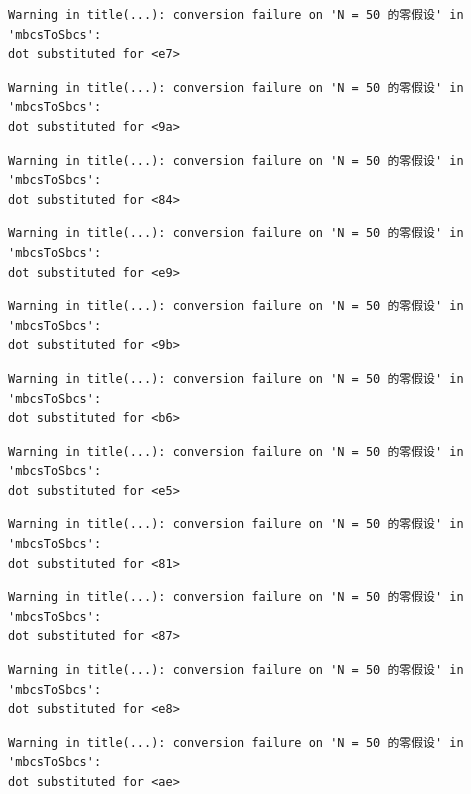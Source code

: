 \documentclass[
  letterpaper,
  DIV=11,
  numbers=noendperiod]{scrreprt}
\begin{document}
\begin{verbatim}
Warning in title(...): conversion failure on 'N = 50 的零假设' in 'mbcsToSbcs':
dot substituted for <e7>
\end{verbatim}

\begin{verbatim}
Warning in title(...): conversion failure on 'N = 50 的零假设' in 'mbcsToSbcs':
dot substituted for <9a>
\end{verbatim}

\begin{verbatim}
Warning in title(...): conversion failure on 'N = 50 的零假设' in 'mbcsToSbcs':
dot substituted for <84>
\end{verbatim}

\begin{verbatim}
Warning in title(...): conversion failure on 'N = 50 的零假设' in 'mbcsToSbcs':
dot substituted for <e9>
\end{verbatim}

\begin{verbatim}
Warning in title(...): conversion failure on 'N = 50 的零假设' in 'mbcsToSbcs':
dot substituted for <9b>
\end{verbatim}

\begin{verbatim}
Warning in title(...): conversion failure on 'N = 50 的零假设' in 'mbcsToSbcs':
dot substituted for <b6>
\end{verbatim}

\begin{verbatim}
Warning in title(...): conversion failure on 'N = 50 的零假设' in 'mbcsToSbcs':
dot substituted for <e5>
\end{verbatim}

\begin{verbatim}
Warning in title(...): conversion failure on 'N = 50 的零假设' in 'mbcsToSbcs':
dot substituted for <81>
\end{verbatim}

\begin{verbatim}
Warning in title(...): conversion failure on 'N = 50 的零假设' in 'mbcsToSbcs':
dot substituted for <87>
\end{verbatim}

\begin{verbatim}
Warning in title(...): conversion failure on 'N = 50 的零假设' in 'mbcsToSbcs':
dot substituted for <e8>
\end{verbatim}

\begin{verbatim}
Warning in title(...): conversion failure on 'N = 50 的零假设' in 'mbcsToSbcs':
dot substituted for <ae>
\end{verbatim}
\end{document}
